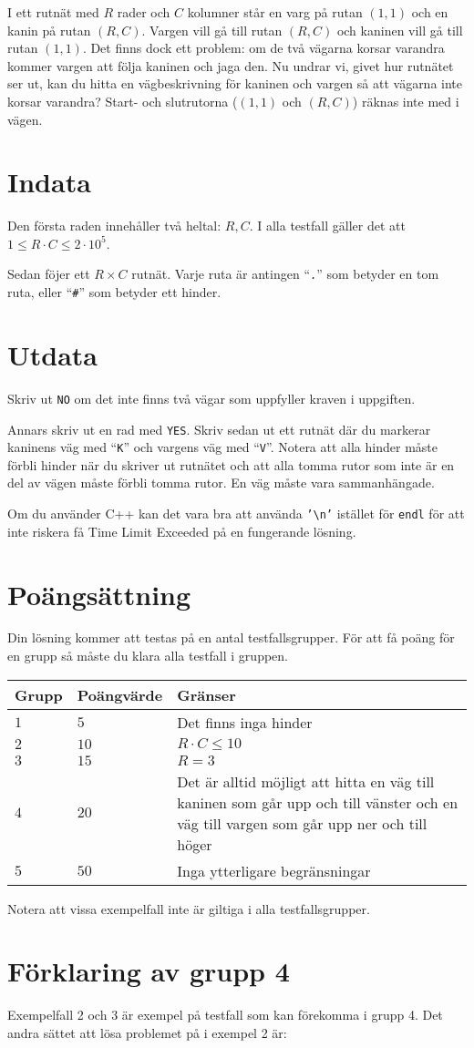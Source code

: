 I ett rutnät med $R$ rader och $C$ kolumner står en varg på rutan $(1, 1)$ och en kanin på rutan $(R, C)$.
Vargen vill gå till rutan $(R, C)$ och kaninen vill gå till rutan $(1, 1)$.
Det finns dock ett problem: om de två vägarna korsar varandra kommer vargen att följa kaninen och jaga den.
Nu undrar vi, givet hur rutnätet ser ut, kan du hitta en vägbeskrivning för kaninen och vargen så att vägarna inte korsar varandra?
Start- och slutrutorna ($(1, 1)$ och $(R, C)$) räknas inte med i vägen.

\section*{Indata}
Den första raden innehåller två heltal: $R, C$. I alla testfall gäller det att $1 \leq R \cdot C \leq 2 \cdot 10^5$.

Sedan föjer ett $R \times C$ rutnät. Varje ruta är antingen ``\texttt{.}'' som betyder en tom ruta, eller ``\texttt{\#}'' som betyder ett hinder.

\section*{Utdata}
Skriv ut \texttt{NO} om det inte finns två vägar som uppfyller kraven i uppgiften.

Annars skriv ut en rad med \texttt{YES}.
Skriv sedan ut ett rutnät där du markerar kaninens väg med ``\texttt{K}'' och vargens väg med ``\texttt{V}''.
Notera att alla hinder måste förbli hinder när du skriver ut rutnätet och att alla tomma rutor som inte är en del av vägen måste förbli tomma rutor.
En väg måste vara sammanhängade.

Om du använder C++ kan det vara bra att använda \texttt{'\textbackslash{}n'} istället för \texttt{endl} för att inte riskera få Time Limit Exceeded på en fungerande lösning.

\section*{Poängsättning}
Din lösning kommer att testas på en antal testfallsgrupper.
För att få poäng för en grupp så måste du klara alla testfall i gruppen.

\noindent
\begin{tabular}{| l | l | p{12cm} |}
  \hline
  Grupp & Poängvärde & Gränser \\ \hline
  $1$   & $5$        & Det finns inga hinder\\ \hline
  $2$   & $10$       & $R \cdot C \leq 10$  \\ \hline
  $3$   & $15$       & $R= 3$  \\ \hline
  $4$   & $20$       & Det är alltid möjligt att hitta en väg till kaninen som går upp och till vänster och en väg till vargen som går upp ner och till höger  \\ \hline
  $5$   & $50$       & Inga ytterligare begränsningar  \\ \hline
\end{tabular}

Notera att vissa exempelfall inte är giltiga i alla testfallsgrupper.

\section*{Förklaring av grupp 4}
Exempelfall 2 och 3 är exempel på testfall som kan förekomma i grupp 4. Det andra sättet att lösa problemet på i exempel 2 är:

